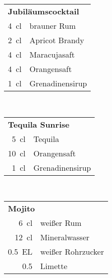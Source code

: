 \begin{table}[h!]
  \vspace{1cm}
  \begin{subtable}[t]{0.3\textwidth}
    \centering
    \vspace{0pt}
    \begin{tabular}{|rl|} \hline
      \multicolumn{2}{|l|}{\textbf{Jubiläumscocktail}} \\
      \SI{4}{\centi\litre} & brauner Rum \\
      \SI{2}{\centi\litre} & Apricot Brandy \\
      \SI{4}{\centi\litre} & Maracujasaft \\
      \SI{4}{\centi\litre} & Orangensaft \\
      \SI{1}{\centi\litre} & Grenadinensirup \\ \hline
    \end{tabular}
  \end{subtable}
  ~
  \begin{subtable}[t]{0.3\textwidth}
    \centering
    \vspace{0pt}
    \begin{tabular}{|rl|} \hline
      \multicolumn{2}{|l|}{\textbf{Tequila Sunrise}} \\
      \SI{5}{\centi\litre} & Tequila \\
      \SI{10}{\centi\litre} & Orangensaft \\
      \SI{1}{\centi\litre} & Grenadinensirup \\ \hline
    \end{tabular}
  \end{subtable}
  ~
  \begin{subtable}[t]{0.3\textwidth}
    \centering
    \vspace{0pt}
    \begin{tabular}{|rl|} \hline
      \multicolumn{2}{|l|}{\textbf{Mojito}} \\
      \SI{6}{\centi\litre} & weißer Rum \\
      \SI{12}{\centi\litre} & Mineralwasser \\
      \SI{0.5}{EL} & weißer Rohrzucker \\
      \num{0.5} & Limette \\ \hline
    \end{tabular}
  \end{subtable}


\end{table}
